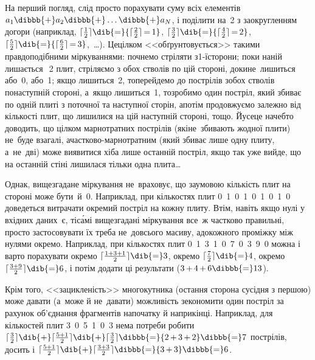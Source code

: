 \Tutorial

На перший погляд, слід просто порахувати суму всіх елементів 
$
a_1\dibbb{{+}}
a_2\dibbb{{+}}
\dots\dibbb{{+}}
a_N
$,
і поділити на~2 з заокругленням догори (наприклад, 
${\lceil\frac{1}{2}\rceil}\dib{{=}}{\lceil\frac{2}{2}\rceil\,{=}\,1}$,
${\lceil\frac{3}{2}\rceil}\dib{{=}}{\lceil\frac{4}{2}\rceil\,{=}\,2}$,
${\lceil\frac{5}{2}\rceil}\dib{{=}}{\lceil\frac{6}{2}\rceil\,{=}\,3}$,~\dots).
Це\nolinebreak[2] цілком <<обґрунтовується>> такими правдоподібними міркуваннями: почнемо стріляти з\nolinebreak[2] \mbox{1-ї}\nolinebreak[2] сторони; 
поки на\nolinebreak[2] ній лишається $\>\,$2 плит, стріляємо з обох стволів по цій стороні, доки\nolinebreak[3] не~лишиться або~0, або~1; якщо лишиться~2, то\nolinebreak[2] перейдемо до пострілів з\nolinebreak[2] обох стволів по\nolinebreak[2] наступній стороні, а~якщо лишиться~1, то\nolinebreak[2] зробимо один постріл, який збиває по одній плиті з поточної та наступної сторін, а\nolinebreak[3] потім продовжуємо залежно від кількості плит, що лишилися на цій наступній стороні, тощо. Й\nolinebreak[3] усе\nolinebreak[3] це начебто доводить, що цілком марнотратних пострілів (які\nolinebreak[2] не~збивають жодної плити) не~буде взагалі, а\nolinebreak[3] част\-ково-марно\-трат\-ним (який збиває лише одну плиту, а~не~дві) може виявитися хіба лише останній постріл, якщо так уже вийде, що на останній стіні лишилася тільки одна плита\dots

Однак, вищезгадане міркування не~враховує, що за\nolinebreak[3] умовою кількість плит на стороні може бути~й~0. Наприклад, при кількостях плит 0~1~0~1~0~1~0~1~0 доведеться витрачати окремий постріл на кожну плиту. Втім, навіть якщо нулі у вхідних даних~є, ті\nolinebreak[3] с\'{а}мі вищезгадані міркування все~ж частково правильні, просто застосовувати їх треба не~до\nolinebreak[3] всього масиву, а\nolinebreak[3] до\nolinebreak[2] кожного проміжку між нулями окремо. Наприклад, при кількостях плит 0~1~3~1~0~7~0~3~9~0 можна і варто порахувати 
окремо $\lceil\frac{1+3+1}{2}\rceil\dib{{=}}3$,
окремо $\lceil\frac{7}{2}\rceil\dib{{=}}4$,
окремо $\lceil\frac{3+9}{2}\rceil\dib{{=}}6$,
і потім додати ці результати (${3\,{+}\,4\,{+}\,6}\dibbb{{=}}13$).

Крім того, <<зацикленість>> многокутника (остання сторона сусідня з першою) може давати (а~може й не~давати) можливість зекономити один постріл за рахунок об'єднання фрагментів на\nolinebreak[3] початку й наприкінці. Наприклад, для кількостей плит 3~0~5~1~0~3 нема потреби робити 
$
\lceil\frac{3}{2}\rceil\dib{{+}}
\lceil\frac{5+1}{2}\rceil\dib{{+}}
\lceil\frac{3}{2}\rceil\dibbb{{=}}
{2\,{+}\,3\,{+}\,2}\dibbb{{=}}7
$
пострілів, досить і 
$
\lceil\frac{5+1}{2}\rceil\dib{{+}}
\lceil\frac{3+3}{2}\rceil\dibbb{{=}}
{3\,{+}\,3}\dibbb{{=}}6
$.

